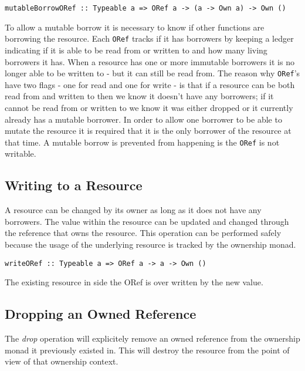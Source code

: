 \documentclass[onehalf,11pt]{beavtex}
\begin{document}
\begin{verbatim}
mutableBorrowORef :: Typeable a => ORef a -> (a -> Own a) -> Own ()
\end{verbatim}

To allow a mutable borrow it is necessary to know if other functions are
borrowing the resource.  Each \texttt{ORef} tracks if it has borrowers by keeping a
ledger indicating if it is able to be read from or written to and how many
living borrowers it has.  When a resource has one or more immutable borrowers it
is no longer able to be written to - but it can still be read from.
The reason why \texttt{ORef}'s have two flags - one for read and one for write - is that
if a resource can be both read from and written to then we know it doesn't have
any borrowers; if it cannot be read from or written to we know it was either
dropped or it currently already has a mutable borrower.
In order to allow one borrower to be able to mutate the resource it is required
that it is the only borrower of the resource at that time. %
A mutable borrow is prevented from happening is the \texttt{ORef} is not writable.


\subsection{Writing to a Resource}

A resource can be changed by its owner as long as it does not have any borrowers.
The value within the resource can be updated and changed through the reference
that owns the resource. This operation can be performed safely because the usage
of the underlying resource is tracked by the ownership monad.

\begin{verbatim}
writeORef :: Typeable a => ORef a -> a -> Own ()
\end{verbatim}

The existing resource in side the ORef is over written by the new value.

\subsection{Dropping an Owned Reference}

The \textit{drop} operation will explicitely remove an owned reference from the
ownership monad it previously existed in.
This will destroy the resource from the point of view of that ownership context.
\end{document}
